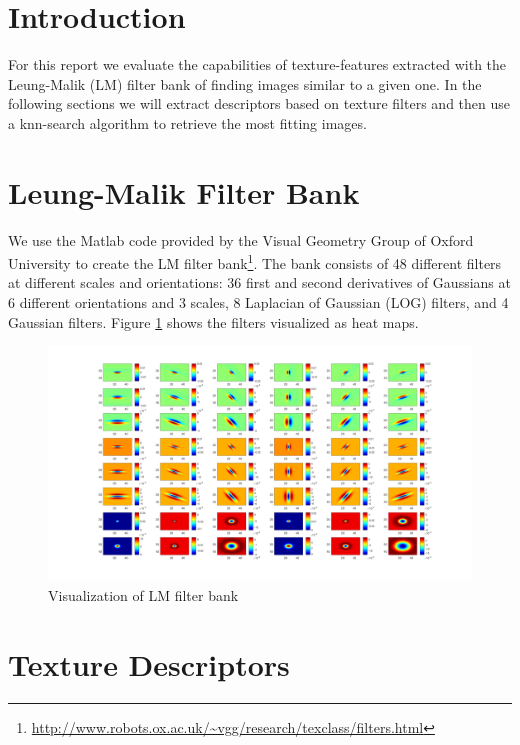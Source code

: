 \section{Introduction}

For this report we evaluate the capabilities of texture-features extracted with the Leung-Malik (LM) filter bank of finding images similar to a given one. In the following sections we will extract descriptors based on texture filters and then use a knn-search algorithm to retrieve the most fitting images.

\section{Leung-Malik Filter Bank}

We use the Matlab code provided by the Visual Geometry Group of Oxford University to create the LM filter bank\footnote{\url{http://www.robots.ox.ac.uk/\~vgg/research/texclass/filters.html}}. The bank consists of 48 different filters at different scales and orientations: 36 first and second derivatives of Gaussians at 6 different orientations and 3 scales, 8 Laplacian of Gaussian (LOG) filters, and 4 Gaussian filters. Figure \ref{fig:lmFilter} shows the filters visualized as heat maps.

\begin{figure}[!hbt]
  \includegraphics[width=\textwidth]{img/LM_filter_bank}
  \caption{Visualization of LM filter bank}
  \label{fig:lmFilter}
\end{figure}


\section{Texture Descriptors}

